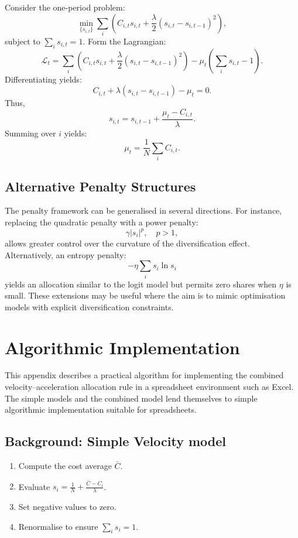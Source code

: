 \documentclass[preprint,authoryear,12pt]{elsarticle}
\begin{document}
Consider the one-period problem:
\[
    \min_{\{s_{i,t}\}}
    \sum_i \left( C_{i,t} s_{i,t} + \frac{\lambda}{2} (s_{i,t}-s_{i,t-1})^2 \right),
\]
subject to $\sum_i s_{i,t} = 1$. Form the Lagrangian:
\[
    \mathcal{L}_t = \sum_i \left( C_{i,t} s_{i,t}
    + \frac{\lambda}{2} (s_{i,t} - s_{i,t-1})^2 \right)
    - \mu_t \left( \sum_i s_{i,t} - 1 \right).
\]
Differentiating yields:
\[
    C_{i,t} + \lambda (s_{i,t} - s_{i,t-1}) - \mu_t = 0.
\]
Thus,
\[
    s_{i,t} = s_{i,t-1} + \frac{\mu_t - C_{i,t}}{\lambda}.
\]
Summing over $i$ yields:
\[
    \mu_t = \frac{1}{N} \sum_i C_{i,t}.
\]


\subsection{Alternative Penalty Structures}

The penalty framework can be generalised in several directions. For instance, replacing the
quadratic penalty with a power penalty:
\[
    \gamma |s_i|^p,
    \quad p > 1,
\]
allows greater control over the curvature of the diversification effect. Alternatively, an entropy
penalty:
\[
    - \eta \sum_i s_i \ln s_i
\]
yields an allocation similar to the logit model but permits zero shares when $\eta$ is small. These
extensions may be useful where the aim is to mimic optimisation models with explicit
diversification constraints.



\newpage
\newpage
\section{Algorithmic Implementation}

This appendix describes a practical algorithm for implementing the combined velocity–acceleration allocation rule in a spreadsheet environment such as Excel. The simple models and the combined model lend themselves to simple algorithmic implementation suitable for spreadsheets.

\subsection{Background: Simple Velocity model}

\begin{enumerate}
    \item Compute the cost average $\bar{C}$.
    \item Evaluate $s_i = \frac{1}{N} + \frac{\bar{C} - C_i}{\lambda}$.
    \item Set negative values to zero.
    \item Renormalise to ensure $\sum_i s_i = 1$.
\end{enumerate}
\end{document}
